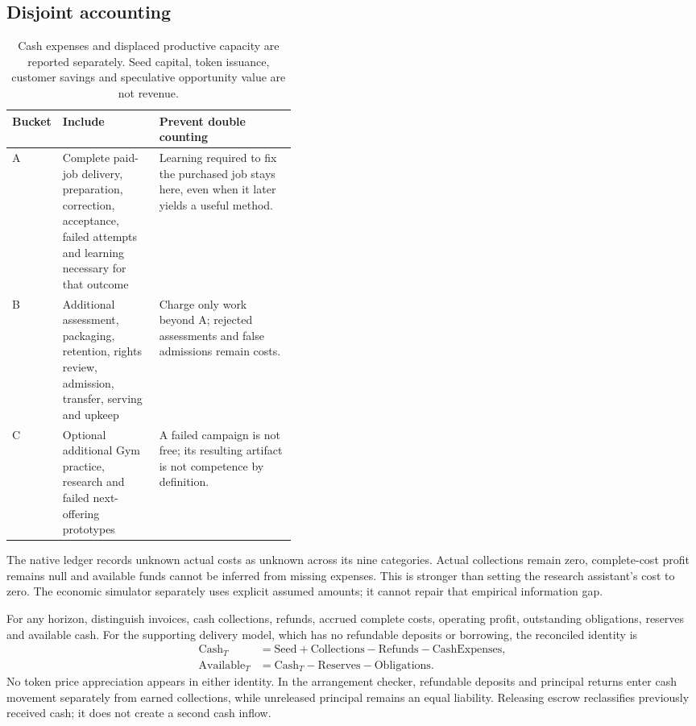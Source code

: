 \documentclass[11pt,letterpaper]{article}
\begin{document}
\subsection{Disjoint accounting}
\begin{table}[H]\small
\begin{tabularx}{\linewidth}{@{}p{0.07\linewidth}p{0.34\linewidth}X@{}}\toprule
Bucket & Include & Prevent double counting \\ \midrule
A & Complete paid-job delivery, preparation, correction, acceptance, failed attempts and learning necessary for that outcome & Learning required to fix the purchased job stays here, even when it later yields a useful method. \\
B & Additional assessment, packaging, retention, rights review, admission, transfer, serving and upkeep & Charge only work beyond A; rejected assessments and false admissions remain costs. \\
C & Optional additional Gym practice, research and failed next-offering prototypes & A failed campaign is not free; its resulting artifact is not competence by definition. \\ \bottomrule
\end{tabularx}
\caption{Cash expenses and displaced productive capacity are reported separately. Seed capital, token issuance, customer savings and speculative opportunity value are not revenue.}
\end{table}

The native ledger records unknown actual costs as unknown across its nine categories. Actual collections remain zero, complete-cost profit remains null and available funds cannot be inferred from missing expenses. This is stronger than setting the research assistant's cost to zero. The economic simulator separately uses explicit assumed amounts; it cannot repair that empirical information gap.

For any horizon, distinguish invoices, cash collections, refunds, accrued complete costs, operating profit, outstanding obligations, reserves and available cash. For the supporting delivery model, which has no refundable deposits or borrowing, the reconciled identity is
\begin{align*}
\mathrm{Cash}_{T}&=\mathrm{Seed}+\mathrm{Collections}-\mathrm{Refunds}-\mathrm{CashExpenses},\\
\mathrm{Available}_{T}&=\mathrm{Cash}_{T}-\mathrm{Reserves}-\mathrm{Obligations}.
\end{align*}
No token price appreciation appears in either identity. In the arrangement checker, refundable deposits and principal returns enter cash movement separately from earned collections, while unreleased principal remains an equal liability. Releasing escrow reclassifies previously received cash; it does not create a second cash inflow.
\end{document}
